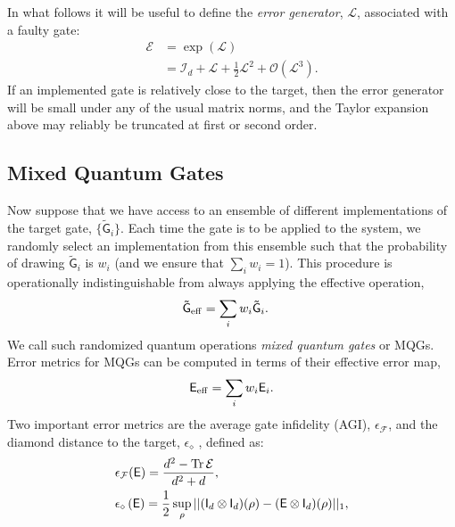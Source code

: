 \documentclass[aps,nofootinbib,pra,notitlepage,twocolumn]{revtex4-1}
\newcommand{\tr}{{\rm Tr\thinspace}}
\newcommand{\order}[1]{\mathcal{O}\left( #1 \right)}
\begin{document}
In what follows it will be useful to define the \emph{error generator}, $\mathcal{L}$, associated with a faulty gate: 
\begin{align}
	\label{eq:generator}
	\mathcal{E} 
		&= \exp\left(\mathcal{L}\right) \\
		&= \mathcal{I}_d + \mathcal{L} + \frac{1}{2}\mathcal{L}^2 + \order{\mathcal{L}^3}.
\end{align}
If an implemented gate is relatively close to the target, then the error generator will be small under any of the usual matrix norms, and the Taylor expansion above may reliably be truncated at first or second order. 


\subsection{Mixed Quantum Gates}
\noindent Now suppose that we have access to an ensemble of different implementations of the target gate, $\{\mathsf{\tilde G}_i\}$.
Each time the gate is to be applied to the system, we randomly select an implementation from this ensemble such that the probability of drawing $\mathsf{\tilde{G}}_i$ is $w_i$ (and we ensure that $\sum_i w_i=1$). This procedure is operationally indistinguishable from always applying the effective operation, 
\begin{align}
	\mathsf{\tilde G}_{\rm eff} &= \sum_i w_i \mathsf{\tilde G}_i.
\end{align}
We call such randomized quantum operations \emph{mixed quantum gates} or MQGs. Error metrics for MQGs can be computed in terms of their effective error map, 
\begin{equation}
	\label{eq:effective_error}
	\mathsf{E}_{\rm eff} = \sum_i w_i \mathsf{E}_i.
\end{equation}
Two important error metrics are the average gate infidelity (AGI), $\epsilon_\mathcal{F}$, and the diamond distance to the target, $\epsilon_\diamond$ \cite{watrous2018theory}, defined as:
\begin{align}
	\label{eq:def_agi}
	&\epsilon_\mathcal{F}(\mathsf{E}) = \frac{d^2 - \tr{\mathcal{E}}}{d^2 + d},\\
	\label{eq:def_diamond}
	&\epsilon_\diamond \left(\mathsf{E}\right)
		= \frac{1}{2} \sup_\rho \vert \vert (\mathsf{I}_d\otimes \mathsf{I}_d)(\rho) 
										  - (\mathsf{E} \otimes \mathsf{I}_d)(\rho) \vert\vert_1,
\end{align}
\end{document}
